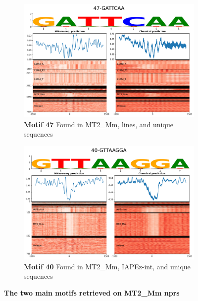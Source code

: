 \documentclass[11pt]{book}
\begin{document}
\begin{figure}[htbp]
    \centering
    \begin{subfigure}{0.48\textwidth}
        \centering
        \includegraphics[width=\linewidth]{Figures/Results/xstreme_onrep_meta_hm/47-GATTCAA.pdf}
        \caption{\textbf{Motif 47} Found in MT2\_Mm, \glspl{line}, and unique sequences}
        \label{fig:xstreme47_ltr}
    \end{subfigure}\hfill
    \begin{subfigure}{0.48\textwidth}
        \centering
        \includegraphics[width=\linewidth]{Figures/Results/xstreme_onrep_meta_hm/40-GTTAAGGA.pdf}
        \caption{\textbf{Motif 40} Found in MT2\_Mm, IAPEz-int, and unique sequences}
        \label{fig:xstreme40_ltr}
    \end{subfigure}
    \caption{\textbf{The two main motifs retrieved on MT2\_Mm \glspl{npr}}}
    \label{fig:main_motif_mt2mm}
\end{figure}
\end{document}
